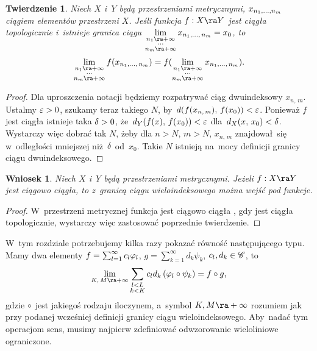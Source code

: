 \documentclass[a4paper,11pt]{article}
\newtheorem{twr}{Twierdzenie} %
\newtheorem{wni}{Wniosek}
\begin{document}
\begin{twr}
  Niech $X$ i~$Y$ będą przestrzeniami metrycznymi,
  $x_{ n_{ 1 }, \ldots, n_{ m } }$ ciągiem elementów przestrzeni $X$.
  Jeśli funkcja $f: X \ra Y$ jest ciągła topologicznie i~istnieje
  granica ciągu
  $\Lim_{ \substack{ n_{ 1 } \ra +\infty \\ \cdots \\ n_{ m } \ra
      +\infty } } x_{ n_{ 1 }, \ld, \, n_{ m } } = x_{ 0 }$, to
  \begin{equation}
    \Lim_{ \substack{ n_{ 1 } \ra +\infty \\ \cdots \\  n_{ m } \ra +\infty } }
    f( x_{ n_{ 1 }, \ld, \, n_{ m } } )
    = f( \Lim_{ \substack{ n_{ 1 } \ra +\infty \\ \cdots \\ n_{ m } \ra
        +\infty } } x_{ n_{ 1 }, \ld, \, n_{ m } } ).
  \end{equation}
\end{twr}

\begin{proof}
  Dla uproszczenia notacji będziemy rozpatrywać ciąg dwuindeksowy
  $x_{ n, \, m }$. Ustalmy $\varepsilon > 0$, szukamy teraz takiego $N$,
  by~$d( f( x_{ n, \, m } ),\, f( x_{ 0 } ) ) < \varepsilon$. Ponieważ $f$
  jest ciągła istnieje taka $\delta > 0$, \linebreak
  że~$d_{ Y }( f( x ),\, f( x_{ 0 } ) ) < \varepsilon$
  dla~$d_{ X }( x,\, x_{ 0 } ) < \delta$. Wystarczy więc dobrać tak $N$,
  żeby dla $n > N$, $m > N$, $x_{ n, \, m }$ znajdował~się
  w~odległości mniejszej niż~$\delta$ od~$x_{ 0 }$. Takie $N$ istnieją
  na~mocy definicji granicy ciągu dwuindeksowego.
\end{proof}

\begin{wni}
  Niech $X$ i~$Y$ będą przestrzeniami metrycznymi. Jeżeli $f: X \ra Y$
  jest ciągowo ciągła, to z~granicą ciągu wieloindeksowego można wejść
  pod funkcje.
\end{wni}

\begin{proof}
  W~przestrzeni metrycznej funkcja jest ciągowo ciągła \wtw, gdy jest
  ciągła topologicznie, wystarczy więc zastosować poprzednie
  twierdzenie.
\end{proof}

\vspace{\spaceFour}


\start {} W~tym
rozdziale potrzebujemy kilka razy pokazać równość następującego typu.
Mamy dwa elementy $f = \sum_{ l = 1 }^{ \infty } c_{ l } \varphi_{ l }$,
$g = \sum_{ k = 1 }^{ \infty } d_{ k } \psi_{ k }$,
$c_{ l }, d_{ k } \in \mathcal{C}$, to
\begin{equation*}
  \Lim_{ K,\, M \ra +\infty } \Sum_{ \substack{ l < L \\ k < K } }
  c_{ l } d_{ k } \, (\vp_{ l } \ci \psi_{ k } ) = f \ci g,
\end{equation*}
gdzie $\circ$ jest jakiegoś rodzaju iloczynem, a~symbol
$K, M \ra +\infty$ rozumiem jak przy podanej wcześniej definicji
granicy ciągu wieloindeksowego. Aby~nadać tym operacjom sens, musimy
najpierw zdefiniować odwzorowanie wieloliniowe ograniczone.
\end{document}
